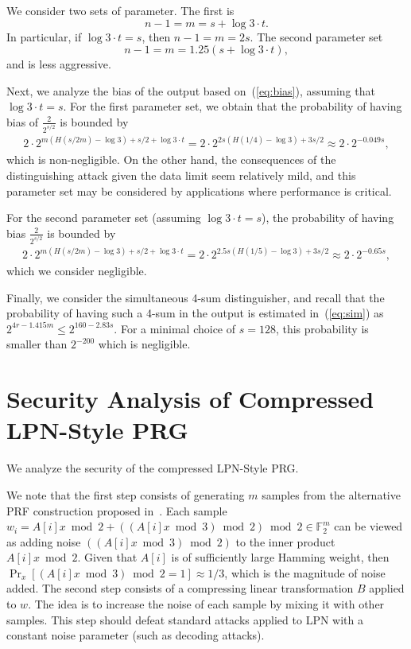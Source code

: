 \documentclass[orivec,envcountsect]{llncs}
\begin{document}
We consider two sets of parameter. 
The first is
$$n - 1 = m = s + \log 3 \cdot t.$$
In particular, if $\log 3 \cdot t  = s$, then
$n - 1 = m = 2s$.
The second parameter set  
$$n-1 = m = 1.25(s + \log 3 \cdot t),$$
and is less aggressive.

Next, we analyze the bias of the output based on~(\ref{eq:bias}), 
assuming that $\log 3 \cdot t = s$.
For the first parameter set,
we obtain that the probability of having bias of $\tfrac{2}{2^{s/2}}$ is bounded by
\begin{align*}
2 \cdot 2^{m (H(s/2m) - \log 3) + s/2 + \log 3 \cdot t} =
2 \cdot 2^{2s (H(1/4) - \log 3) + 3s/2} \approx
2 \cdot 2^{-0.049s},
\end{align*}
which is non-negligible.
On the other hand, the consequences of the distinguishing attack given the data limit
seem relatively mild, and this parameter set may be considered by applications 
where performance is critical.

For the second parameter set (assuming $\log 3 \cdot t = s$),
the probability of having bias $\tfrac{2}{2^{s/2}}$ is bounded by
\begin{align*}
2 \cdot 2^{m (H(s/2m) - \log 3) + s/2 + \log 3 \cdot t} =
2 \cdot 2^{2.5s (H(1/5) - \log 3) + 3s/2} \approx
2 \cdot 2^{-0.65s},
\end{align*}
which we consider negligible.
 
Finally, we consider the simultaneous 4-sum distinguisher,
and recall that the probability of having such a 4-sum in the output is estimated 
in~(\ref{eq:sim}) as $2^{4r - 1.415 m} \leq 2^{160 - 2.83s}$.
For a minimal choice of $s = 128$, this probability is smaller than $2^{-200}$
which is negligible.



\section{Security Analysis of Compressed LPN-Style PRG}

We analyze the security of the compressed LPN-Style PRG.

We note that the first step consists of generating $m$ samples from the alternative PRF construction proposed
in~\cite{BonehIPSW18}. Each sample
$w_i = A[i] x \bmod 2 + ((A[i] x \bmod 3) \bmod 2) \bmod 2 \in \mathbb{F}_2^m$
can be viewed as adding noise $((A[i] x \bmod 3) \bmod 2)$ to the inner product $A[i] x \bmod 2$.
Given that $A[i]$ is of sufficiently large Hamming weight, then
$\Pr_x[(A[i] x \bmod 3) \bmod 2 = 1] \approx 1/3$, which is the magnitude of noise added.
The second step consists of a compressing linear transformation $B$ applied to $w$.
The idea is to increase the noise of each sample by mixing it with other samples.
This step should defeat standard attacks applied to LPN with a constant noise parameter
(such as decoding attacks).
\end{document}

